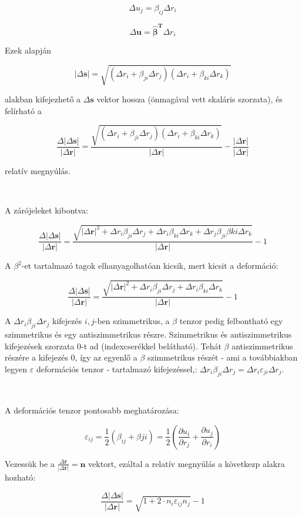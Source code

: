 \documentclass[a4paper, 12pt]{article}
\begin{document}
$$\Delta u_j=\beta_{ij}\Delta r_i$$

$$\Delta \mathbf{u}=\mathbf{\hat\beta^{T}}\Delta r_i$$

Ezek alapján

$$|\Delta\mathbf{s}|=\sqrt{(\Delta r_i+\beta_{ji}\Delta r_j)(\Delta r_i+\beta_{ki}\Delta r_k)}$$

alakban kifejezhető a $\Delta\mathbf{s}$ vektor hossza (önmagával vett skaláris szorzata), és felírható a

$$\frac{\Delta|\Delta\mathbf{s}|}{|\Delta\mathbf{r}|}=\frac{\sqrt{(\Delta r_i+\beta_{ji}\Delta r_j)(\Delta r_i+\beta_{ki}\Delta r_k)}}{|\Delta\mathbf{r}|}-\frac{|\Delta\mathbf{r}|}{|\Delta\mathbf{r}|}$$

relatív megnyúlás. 

~

A zárójeleket kibontva:

$$\frac{\Delta|\Delta\mathbf{s}|}{|\Delta\mathbf{r}|}=\frac{\sqrt{|\Delta\mathbf{r}|^2+\Delta r_i\beta_{ji}\Delta r_j+\Delta r_i\beta_{ki}\Delta r_k+\Delta r_j\beta_{ji}\beta{ki}\Delta r_k}}{|\Delta\mathbf{r}|}-1$$

A $\beta^2$-et tartalmazó tagok elhanyagolhatóan kicsik, mert kicsit a deformáció:

$$\frac{\Delta|\Delta\mathbf{s}|}{|\Delta\mathbf{r}|}=\frac{\sqrt{|\Delta\mathbf{r}|^2+\Delta r_i\beta_{ji}\Delta r_j+\Delta r_i\beta_{ki}\Delta r_k}}{|\Delta\mathbf{r}|}-1$$

A $\Delta r_i\beta_{ji}\Delta r_j$ kifejezés $i,j$-ben szimmetrikus, a $\beta$ tenzor pedig felbontható egy szimmetrikus és egy antiszimmetrikus részre. Szimmetrikus és antiszimmetrikus kifejezések szorzata $0$-t ad (indexcserékkel belátható). Tehát $\beta$ antiszimmetrikus részére a kifejezés $0$, így az egyenlő a $\beta$ szimmetrikus részét - ami a továbbiakban legyen $\varepsilon$ deformációs tenzor - tartalmazó kifejezéssel,: $\Delta r_i\beta_{ji}\Delta r_j=\Delta r_i\varepsilon_{ji}\Delta r_j$. 

~

A deformációs tenzor pontosabb meghatározása:

$$\varepsilon_{ij}=\frac12(\beta_{ij}+\beta{ji})=\frac12\left(\frac{\partial u_i}{\partial r_j}+\frac{\partial u_j}{\partial r_i}\right)$$

Vezessük be a $\frac{\Delta\mathbf{r}}{|\Delta\mathbf{r}|}=\mathbf{n}$ vektort, ezáltal a relatív megnyúlás a következp alakra hozható:

$$\frac{\Delta|\Delta\mathbf{s}|}{|\Delta\mathbf{r}|}=\sqrt{1+2\cdot n_i\varepsilon_{ij}n_j}-1$$
\end{document}
